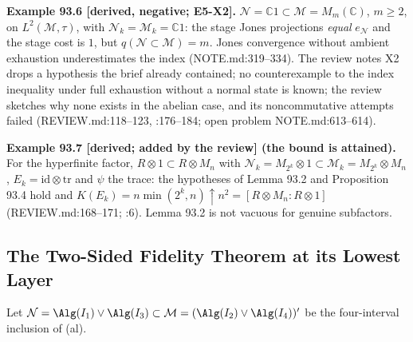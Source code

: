 \textbf{Example 93.6 [derived, negative; E5-X2].}  \(\mathcal N=\mathbb C1\subset\mathcal M=M_m(\mathbb C)\), \(m\ge2\), on
\(L^2(\mathcal M,\tau)\), with \(\mathcal N_k=\mathcal M_k=\mathbb C1\): the stage Jones projections \emph{equal} \(e_{\mathcal N}\) and the stage
cost is \(1\), but \(q(\mathcal N\subset\mathcal M)=m\).  Jones convergence without ambient exhaustion underestimates the index
(NOTE.md:319--334).  The review notes X2 drops a hypothesis the brief already contained; no counterexample to the
index inequality under full exhaustion without a normal state is known; the review sketches why none exists in the
abelian case, and its noncommutative attempts failed (REVIEW.md:118--123, :176--184; open problem NOTE.md:613--614).

\textbf{Example 93.7 [derived; added by the review] (the bound is attained).}  For the hyperfinite factor, \(R\otimes1\subset
R\otimes M_n\) with \(\mathcal N_k=M_{2^k}\otimes1\subset\mathcal M_k=M_{2^k}\otimes M_n\), \(E_k=\mathrm{id}\otimes\mathrm{tr}\) and \(\psi\) the
trace: the hypotheses of Lemma 93.2 and Proposition 93.4 hold and \(K(E_k)=n\min(2^k,n)\uparrow n^2=[R\otimes M_n:R\otimes1]\)
(REVIEW.md:168--171; :6).  Lemma 93.2 is not vacuous for genuine subfactors.

\subsection{The Two-Sided Fidelity Theorem at its Lowest Layer}

Let \(\mathcal N=\Alg(I_1)\vee\Alg(I_3)\subset\mathcal M=(\Alg(I_2)\vee\Alg(I_4))'\) be the four-interval inclusion of (al).

